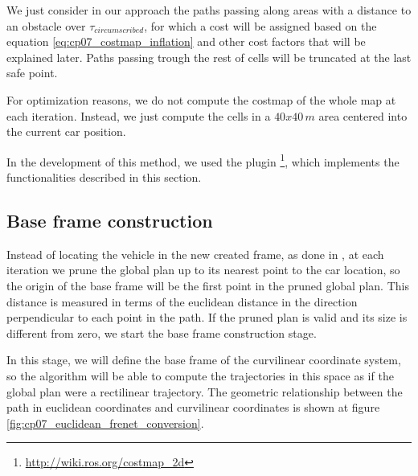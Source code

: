We just consider in our approach the paths passing along areas with a distance to an obstacle over $\tau_{circumscribed}$, for which a cost will be assigned based on the equation \ref{eq:cp07_costmap_inflation} and other cost factors that will be explained later. Paths passing trough the rest of cells will be truncated at the last safe point.

For optimization reasons, we do not compute the costmap of the whole map at each iteration. Instead, we just compute the cells in a $40x40\,m$ area centered into the current car position. 

In the development of this method, we used the \ROS plugin \footnote{\url{http://wiki.ros.org/costmap\_2d}}, which implements the functionalities described in this section. 

\subsection{Base frame construction}\label{ch:chapter07_01_02}

Instead of locating the vehicle in the new created frame, as done in \cite{chu2012local}, at each iteration we prune the global plan up to its nearest point to the car location, so the origin of the base frame will be the first point in the pruned global plan. This distance is measured in terms of the euclidean distance in the direction perpendicular to each point in the path. If the pruned plan is valid and its size is different from zero, we start the base frame construction stage.

In this stage, we will define the base frame of the curvilinear coordinate system, so the algorithm will be able to compute the trajectories in this space as if the global plan were a rectilinear trajectory. The geometric relationship between the path in euclidean coordinates and curvilinear coordinates is shown at figure \ref{fig:cp07_euclidean_frenet_conversion}.

